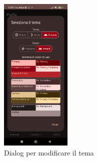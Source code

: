 \documentclass[12pt, a4paper]{report}
\begin{document}
		\begin{figure}[h]
			\centering
			\includegraphics[width=0.3\textwidth]{themeSelector.jpg} 
		  \caption{Dialog per modificare il tema}
			
		\end{figure}





\printbibliography
\end{document}
